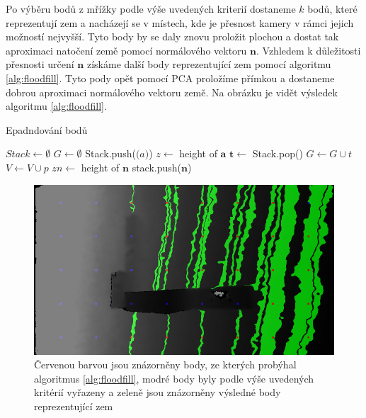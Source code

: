 \documentclass[twoside]{ctuthesis}
\newcommand{\tl}[1]{$\mathbf{#1}$}
\begin{document}
Po výběru bodů z mřížky podle výše uvedených kriterií dostaneme $k$ bodů, které reprezentují zem a nacházejí se v místech, kde je přesnost kamery v rámci jejich možností nejvyšší. Tyto body by se daly znovu proložit plochou a dostat tak aproximaci natočení země pomocí normálového vektoru \tl{n}. Vzhledem k důležitosti přesnosti určení \tl{n} získáme další body reprezentující zem pomocí algoritmu \ref{alg:floodfill}. Tyto pody opět pomocí PCA proložíme přímkou a dostaneme dobrou aproximaci normálového vektoru země. Na obrázku je vidět výsledek algoritmu \ref{alg:floodfill}.
    
    
\begin{algorithm}
    \caption{Epadndování bodů}
    \label{alg:floodfill}
    \begin{algorithmic}
        \STATE $Stack \gets \emptyset$
        \STATE $G \gets \emptyset$
            \STATE Stack.push($\mathbf(a)$)
            \STATE $z \gets$ height of $\mathbf{a}$
                \STATE $\mathbf{t} \gets$ Stack.pop()
                \STATE $G \gets G \cup t$
                \STATE $V \gets V \cup p$
                    \STATE $zn \gets$ height of $\mathbf{n}$
                    \STATE stack.push($\mathbf{n}$)
                    \ENDIF
                \ENDFOR
            \ENDWHILE
        \ENDFOR
    \end{algorithmic}
\end{algorithm}

\begin{figure}
    \centering
    \includegraphics[width = \linewidth]{pictures/prob0001body_gnd.png}
    \caption{Červenou barvou jsou znázorněny body, ze kterých probýhal algoritmus \ref{alg:floodfill}, modré body byly podle výše uvedených kritérií vyřazeny a zeleně jsou znázorněny výsledné body reprezentující zem}
    \label{fig:floodfill}
\end{figure}
\end{document}

